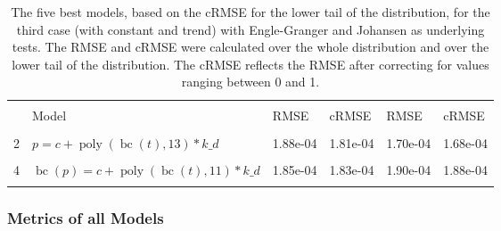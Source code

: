 \documentclass[12pt,a4paper]{article}
\DeclareMathOperator{\bc}{bc}
\DeclareMathOperator{\poly}{poly}
\begin{document}
\begin{table}[!h]

\caption{\label{tab:5_best_e_j_3}\label{tab:best_e_j_3} The five best models, based on the cRMSE for the lower tail of the distribution, for the third case (with constant and trend) with Engle-Granger and Johansen as underlying tests. The RMSE and cRMSE were calculated over the whole distribution and over the lower tail of the distribution. The cRMSE reflects the RMSE after correcting for values ranging between 0 and 1.}
\centering
\fontsize{10}{12}\selectfont
\begin{tabular}[t]{ll>{\raggedleft\arraybackslash}p{2cm}>{\raggedleft\arraybackslash}p{2cm}>{\raggedleft\arraybackslash}p{2cm}>{\raggedleft\arraybackslash}p{2cm}}
\toprule
\multicolumn{1}{c}{\textbf{}} & \multicolumn{1}{c}{\textbf{}} & \multicolumn{2}{c}{\textbf{Full Distribution}} & \multicolumn{2}{c}{\textbf{Lower Tail ($p \leq 0.2$)}} \\
\cmidrule(l{3pt}r{3pt}){3-4} \cmidrule(l{3pt}r{3pt}){5-6}
  & Model & RMSE & cRMSE & RMSE & cRMSE\\
\midrule
\cellcolor{gray!6}{1} & \cellcolor{gray!6}{$\bc(p) = c + \poly\left( \bc(t), 13 \right) * k\_d$} & \cellcolor{gray!6}{1.45e-04} & \cellcolor{gray!6}{1.45e-04} & \cellcolor{gray!6}{1.53e-04} & \cellcolor{gray!6}{1.52e-04}\\
2 & $p = c + \poly\left( \bc(t), 13 \right) * k\_d$ & 1.88e-04 & 1.81e-04 & 1.70e-04 & 1.68e-04\\
\cellcolor{gray!6}{3} & \cellcolor{gray!6}{$\bc(p) = c + \poly\left( \bc(t), 12 \right) * k\_d$} & \cellcolor{gray!6}{1.84e-04} & \cellcolor{gray!6}{1.78e-04} & \cellcolor{gray!6}{1.93e-04} & \cellcolor{gray!6}{1.86e-04}\\
4 & $\bc(p) = c + \poly\left( \bc(t), 11 \right) * k\_d$ & 1.85e-04 & 1.83e-04 & 1.90e-04 & 1.88e-04\\
\cellcolor{gray!6}{5} & \cellcolor{gray!6}{$p = c + \poly\left( \bc(t), 12 \right) * k\_d$} & \cellcolor{gray!6}{2.30e-04} & \cellcolor{gray!6}{2.19e-04} & \cellcolor{gray!6}{2.28e-04} & \cellcolor{gray!6}{2.17e-04}\\
\bottomrule
\end{tabular}
\end{table}

\FloatBarrier

\hypertarget{metrics-of-all-models-1}{%
\subsubsection{Metrics of all Models}\label{metrics-of-all-models-1}}
\end{document}
